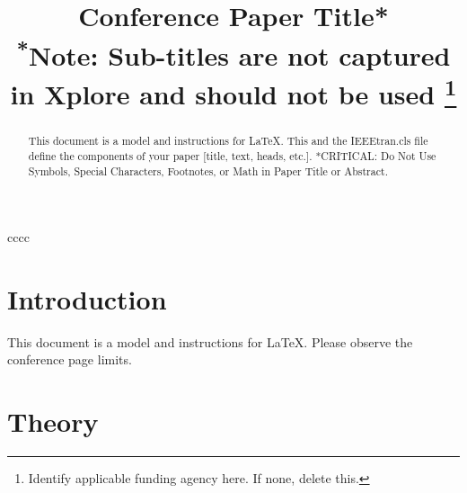 \documentclass[conference]{IEEEtran}
\begin{document}
\title{Conference Paper Title*\\
{\footnotesize \textsuperscript{*}Note: Sub-titles are not captured in Xplore and
should not be used}
\thanks{Identify applicable funding agency here. If none, delete this.}
}

\author{
}

\maketitle

\begin{abstract}
This document is a model and instructions for \LaTeX.
This and the IEEEtran.cls file define the components of your paper [title, text, heads, etc.]. *CRITICAL: Do Not Use Symbols, Special Characters, Footnotes, 
or Math in Paper Title or Abstract.
\end{abstract}cccc

\section{Introduction}
    This document is a model and instructions for \LaTeX.
    Please observe the conference page limits. 

\section{Theory}
\end{document}

